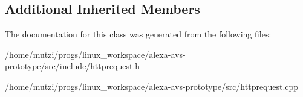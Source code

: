 \subsection*{Additional Inherited Members}


The documentation for this class was generated from the following files\+:\begin{DoxyCompactItemize}
\item 
/home/mutzi/progs/linux\+\_\+workspace/alexa-\/avs-\/prototype/src/include/httprequest.\+h\item 
/home/mutzi/progs/linux\+\_\+workspace/alexa-\/avs-\/prototype/src/httprequest.\+cpp\end{DoxyCompactItemize}
